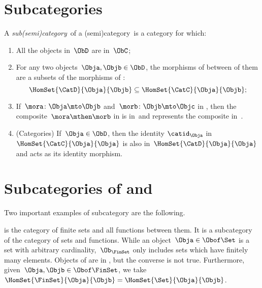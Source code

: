 
\section{Subcategories}
\label{sec:subcategories}



\begin{ctdefinition}[Subcategory]
    \label{def:subcategory}
    A \emph{sub(semi)category}~\CatD of a (semi)category~\CatC is a category for which:
    \begin{enumerate}
        \item All the objects in~$\ObD$ are in~$\ObC$;
        \item For any two objects~$\Obja,\Objb\in \ObD$,
              the morphisms of \CatD between of them are a subsets of the morphisms of \CatC:
              \begin{equation}
                  \HomSet{\CatD}{\Obja}{\Objb}\subseteq \HomSet{\CatC}{ \Obja}{\Objb};
              \end{equation}
        \item If~$\mora \colon \Obja \mto \Objb$ and~$\morb\colon \Objb\mto \Objc$ in \CatD, then the composite~$\mora \mthen \morb$ in \CatC is in~\CatD and represents the composite in~\CatD.
        \item (Categories) If~$\Obja\in \ObD$, then the identity $\catid_\Obja$ in $\HomSet{\CatC}{\Obja}{\Obja}$ is also in~$\HomSet{\CatD}{\Obja}{\Obja}$ and acts as its identity morphism.
    \end{enumerate}
\end{ctdefinition}

\section{Subcategories of \Rel and \Set}

Two important examples of subcategory are the following.

\begin{example}
    \label{ex:FinSet}
    \iindex{\FinSet} is the category of finite sets and all functions between them.
    It is a subcategory of the category \Set of sets and functions.
    While an object~$\Obja \in \Obof\Set$ is a set with arbitrary cardinality,~$\Ob_{\FinSet}$ only includes sets which have finitely many elements.
    Objects of \FinSet are in \Set, but the converse is not true.
    Furthermore, given~$\Obja,\Objb\in \Obof\FinSet$, we take~$\HomSet{\FinSet}{\Obja}{\Objb} =\HomSet{\Set}{\Obja}{\Objb}$.
\end{example}

